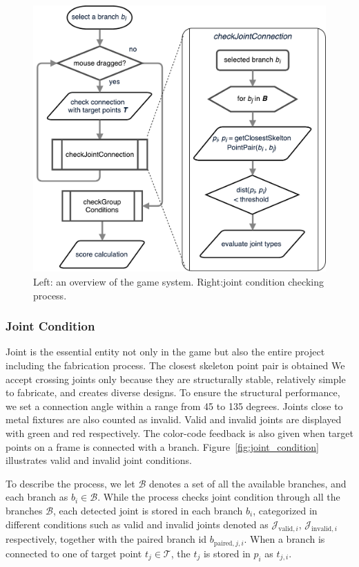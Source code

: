 \begin{figure}[ht]
  \begin{center}
    \includegraphics[width = 0.25\paperwidth]{images/system/closestPointAlgorithm.pdf}
    \caption{Left: an overview of the game system. Right:joint condition checking process.}
    \label{fig:system_flowchart}
  \end{center}
\end{figure}

\subsubsection*{Joint Condition}
Joint is the essential entity not only in the game but also the entire project including the fabrication process.
The closest skeleton point pair is obtained
We accept crossing joints only because they are structurally stable, relatively simple to fabricate, and creates diverse designs.
To ensure the structural performance, we set a connection angle within a range from 45 to 135 degrees.
Joints close to metal fixtures are also counted as invalid.
Valid and invalid joints are displayed with green and red respectively.
The color-code feedback is also given when target points on a frame is connected with a branch.
Figure~\ref{fig:joint_condition} illustrates valid and invalid joint conditions.


To describe the process, we let $\mathcal{B}$ denotes a set of all the available branches, and each branch as $ b_i \in \mathcal{B}$.
While the process checks joint condition through all the branches $\mathcal{B}$, each detected joint is stored in each branch $b_i$, categorized in different conditions such as valid and invalid joints denoted as
$\mathcal{J}_{\text{valid},i}$,
$\mathcal{J}_{\text{invalid},i}$ respectively, together with the paired branch id $b_{\text{paired},j, i}$.
When a branch is connected to one of target point $t_j \in \mathcal{T} $, the $t_j$ is stored in $p_i$ as $t_{j,i}$.

